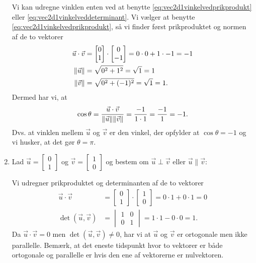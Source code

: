\begin{enumerate}
Vi kan udregne vinklen enten ved at benytte \eqref{eq:vec2d1vinkelvedprikprodukt} eller \eqref{eq:vec2d1vinkelveddeterminant}. Vi vælger at benytte \eqref{eq:vec2d1vinkelvedprikprodukt}, så vi finder først prikproduktet og normen af de to vektorer
\begin{align*}
\vec{u} \cdot \vec{v} &= \begin{bmatrix} 0 \\ 1 \end{bmatrix} \cdot \begin{bmatrix} 0 \\ -1 \end{bmatrix} = 0 \cdot 0 + 1 \cdot -1 = -1 \\
\Vert \vec{u}\Vert &= \sqrt{0^2+1^2} = \sqrt{1}=1 \\
\Vert \vec{v}\Vert &= \sqrt{0^2 + (-1)^2}=\sqrt{1}=1.
\end{align*}
Dermed har vi, at
\begin{align*}
\cos \theta = \frac{\vec{u} \cdot \vec{v}}{\Vert \vec{u}\Vert\Vert \vec{v}\Vert} = \frac{-1}{1 \cdot 1} = \frac{-1}{1} = -1.
\end{align*}
Dvs. at vinklen mellem $\vec{u}$ og $\vec{v}$ er den vinkel, der opfylder at $\cos \theta =-1$ og vi husker, at det gør $\theta = \pi$.
\item Lad $\vec{u}= \begin{bmatrix} 0 \\ 1 \end{bmatrix}$ og $\vec{v}= \begin{bmatrix} 1 \\ 0 \end{bmatrix}$ og bestem om $\vec{u}\perp \vec{v}$ eller $\vec{u} \parallel\vec{v}$:

Vi udregner prikproduktet og determinanten af de to vektorer
\begin{align*}
\vec{u} \cdot \vec{v} &= \begin{bmatrix} 0 \\ 1 \end{bmatrix}\cdot  \begin{bmatrix} 1 \\ 0 \end{bmatrix} = 0 \cdot 1 + 0 \cdot 1 = 0 \\
\det(\vec{u},\vec{v}) &= \begin{vmatrix}
1 & 0 \\
0 & 1
\end{vmatrix}
= 1 \cdot 1 - 0 \cdot 0 = 1.
\end{align*}
Da $\vec{u} \cdot \vec{v}=0$ men $\det(\vec{u},\vec{v})\neq 0$, har vi at $\vec{u}$ og $\vec{v}$ er ortogonale men ikke parallelle. Bemærk, at det eneste tidspunkt hvor to vektorer er både ortogonale og parallelle er hvis den ene af vektorerne er nulvektoren.
\end{enumerate}